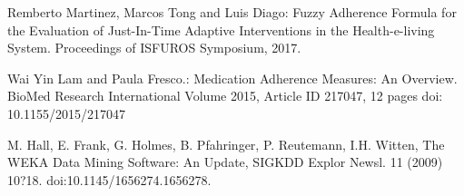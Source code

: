 \documentclass[graybox]{svmult}
\begin{document}
\begin{thebibliography}{99}
  Remberto Martinez, Marcos Tong and Luis Diago: Fuzzy Adherence Formula for the Evaluation of Just-In-Time Adaptive Interventions in the Health-e-living System. Proceedings of ISFUROS Symposium,  2017.

 Wai Yin Lam and Paula Fresco.: Medication Adherence Measures: An Overview. BioMed Research International Volume 2015, Article ID 217047, 12 pages doi: 10.1155/2015/217047

 M. Hall, E. Frank, G. Holmes, B. Pfahringer, P. Reutemann, I.H. Witten, The WEKA Data Mining Software:  An Update, SIGKDD Explor Newsl. 11 (2009) 10?18. doi:10.1145/1656274.1656278.

\end{thebibliography}
\end{document}
